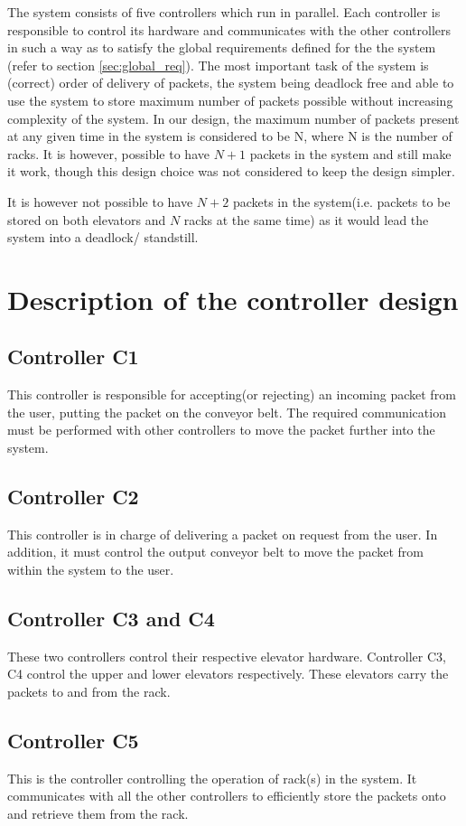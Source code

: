 The system consists of five controllers which run in parallel. Each controller is responsible to control its hardware and communicates with the other controllers in such a way as to satisfy the global requirements defined for the the system (refer to section \ref{sec:global_req}). The most important task of the system is (correct) order of delivery of packets, the system being deadlock free and able to use the system to store maximum number of packets possible without increasing complexity of the system. In our design, the maximum number of packets present at any given time in the system is considered to be N, where N is the number of racks. It is however, possible to have $N + 1$ packets in the system and still make it work, though this design choice was not considered to keep the design simpler.

It is however not possible to have $N+2$ packets in the system(i.e. packets to be stored on both elevators and $N$ racks at the same time) as it would lead the system into a deadlock/ standstill.

\section*{Description of the controller design}
\subsection*{Controller \textbf{C1}}
This controller is responsible for accepting(or rejecting) an incoming packet from the user, putting the packet on the conveyor belt. The required communication must be performed with other controllers to move the packet further into the system.
\subsection*{Controller \textbf{C2}}
This controller is in charge of delivering a packet on request from the user. In addition, it must control the output conveyor belt to move the packet from within the system to the user.
\subsection*{Controller \textbf{C3 and C4}}
These two controllers control their respective elevator hardware. Controller C3, C4 control the upper and lower elevators respectively.
These elevators carry the packets to and from the rack.
\subsection*{Controller \textbf{C5}}
This is the controller controlling the operation of rack(s) in the system. It communicates with all the other controllers to efficiently store the packets onto and retrieve them from the rack.

